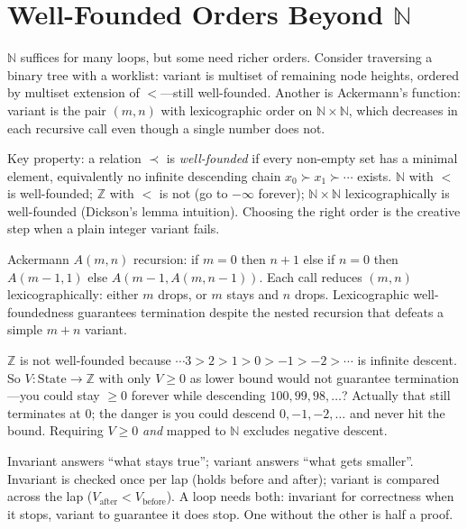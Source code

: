 \section{\texorpdfstring{Well-Founded Orders Beyond $\mathbb{N}$}{Well-Founded Orders Beyond N}}
\label{sec:wf-beyond}
$\mathbb{N}$ suffices for many loops, but some need richer orders. Consider traversing a binary tree with a worklist: variant is multiset of remaining node heights, ordered by multiset extension of $<$—still well-founded. Another is Ackermann's function: variant is the pair $(m,n)$ with lexicographic order on $\mathbb{N}\times\mathbb{N}$, which decreases in each recursive call even though a single number does not.

Key property: a relation $\prec$ is \emph{well-founded} if every non-empty set has a minimal element, equivalently no infinite descending chain $x_0\succ x_1\succ\cdots$ exists. $\mathbb{N}$ with $<$ is well-founded; $\mathbb{Z}$ with $<$ is not (go to $-\infty$ forever); $\mathbb{N}\times\mathbb{N}$ lexicographically is well-founded (Dickson's lemma intuition). Choosing the right order is the creative step when a plain integer variant fails.

\begin{example}
Ackermann $A(m,n)$ recursion: if $m=0$ then $n+1$ else if $n=0$ then $A(m-1,1)$ else $A(m-1,A(m,n-1))$. Each call reduces $(m,n)$ lexicographically: either $m$ drops, or $m$ stays and $n$ drops. Lexicographic well-foundedness guarantees termination despite the nested recursion that defeats a simple $m+n$ variant.
\end{example}

\begin{remark}
$\mathbb{Z}$ is not well-founded because $\cdots 3>2>1>0>-1>-2>\cdots$ is infinite descent. So $V:\text{State}\to\mathbb{Z}$ with only $V\ge0$ as lower bound would not guarantee termination—you could stay $\ge0$ forever while descending $100,99,98,\dots$? Actually that still terminates at $0$; the danger is you could descend $0,-1,-2,\dots$ and never hit the bound. Requiring $V\ge0$ \emph{and} mapped to $\mathbb{N}$ excludes negative descent.
\end{remark}

\begin{remark}
Invariant answers ``what stays true''; variant answers ``what gets smaller''. Invariant is checked once per lap (holds before and after); variant is compared across the lap ($V_{\text{after}}<V_{\text{before}}$). A loop needs both: invariant for correctness when it stops, variant to guarantee it does stop. One without the other is half a proof.
\end{remark}

